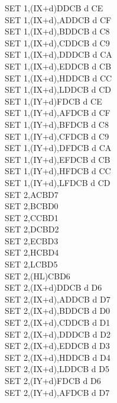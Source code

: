 \begin{multicols}{3}
{\begin{tabbing}
        SET 1,(IX+d)\>DDCB d CE\\
        SET 1,(IX+d),A\UNDOC\>DDCB d CF\\
        SET 1,(IX+d),B\UNDOC\>DDCB d C8\\
        SET 1,(IX+d),C\UNDOC\>DDCB d C9\\
        SET 1,(IX+d),D\UNDOC\>DDCB d CA\\
        SET 1,(IX+d),E\UNDOC\>DDCB d CB\\
        SET 1,(IX+d),H\UNDOC\>DDCB d CC\\
        SET 1,(IX+d),L\UNDOC\>DDCB d CD\\
        SET 1,(IY+d)\>FDCB d CE\\
        SET 1,(IY+d),A\UNDOC\>FDCB d CF\\
        SET 1,(IY+d),B\UNDOC\>FDCB d C8\\
        SET 1,(IY+d),C\UNDOC\>FDCB d C9\\
        SET 1,(IY+d),D\UNDOC\>FDCB d CA\\
        SET 1,(IY+d),E\UNDOC\>FDCB d CB\\
        SET 1,(IY+d),H\UNDOC\>FDCB d CC\\
        SET 1,(IY+d),L\UNDOC\>FDCB d CD\\
        SET 2,A\>CBD7\\
        SET 2,B\>CBD0\\
        SET 2,C\>CBD1\\
        SET 2,D\>CBD2\\
        SET 2,E\>CBD3\\
        SET 2,H\>CBD4\\
        SET 2,L\>CBD5\\
        SET 2,(HL)\>CBD6\\
        SET 2,(IX+d)\>DDCB d D6\\
        SET 2,(IX+d),A\UNDOC\>DDCB d D7\\
        SET 2,(IX+d),B\UNDOC\>DDCB d D0\\
        SET 2,(IX+d),C\UNDOC\>DDCB d D1\\
        SET 2,(IX+d),D\UNDOC\>DDCB d D2\\
        SET 2,(IX+d),E\UNDOC\>DDCB d D3\\
        SET 2,(IX+d),H\UNDOC\>DDCB d D4\\
        SET 2,(IX+d),L\UNDOC\>DDCB d D5\\
        SET 2,(IY+d)\>FDCB d D6\\
        SET 2,(IY+d),A\UNDOC\>FDCB d D7\\

\end{tabbing}}
\end{multicols}
